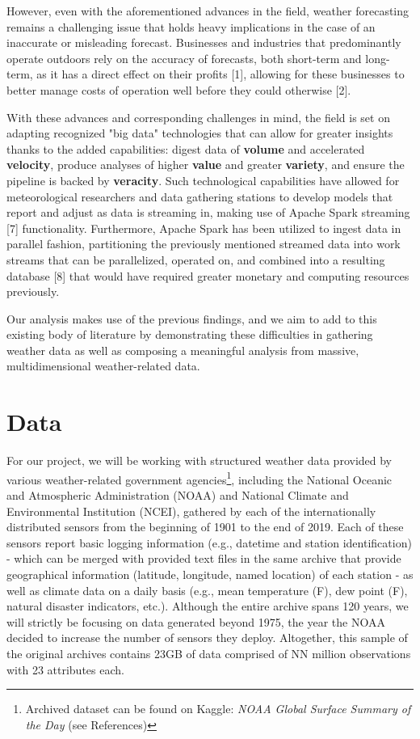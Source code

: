 \documentclass[conference]{IEEEtran}
\begin{document}
However, even with the aforementioned advances in the field, weather forecasting remains a challenging issue that holds heavy implications in the case of an inaccurate or misleading forecast. Businesses and industries that predominantly operate outdoors rely on the accuracy of forecasts, both short-term and long-term, as it has a direct effect on their profits [1], allowing for these businesses to better manage costs of operation well before they could otherwise [2].

With these advances and corresponding challenges in mind, the field is set on adapting recognized "big data" technologies that can allow for greater insights thanks to the added capabilities: digest data of \textbf{volume} and accelerated \textbf{velocity}, produce analyses of higher \textbf{value} and greater \textbf{variety}, and ensure the pipeline is backed by \textbf{veracity}. Such technological capabilities have allowed for meteorological researchers and data gathering stations to develop models that report and adjust as data is streaming in, making use of Apache Spark streaming [7] functionality. Furthermore, Apache Spark has been utilized to ingest data in parallel fashion, partitioning the previously mentioned streamed data into work streams that can be parallelized, operated on, and combined into a resulting database [8] that would have required greater monetary and computing resources previously.

Our analysis makes use of the previous findings, and we aim to add to this existing body of literature by demonstrating these difficulties in gathering weather data as well as composing a meaningful analysis from massive, multidimensional weather-related data.

\section{Data}

For our project, we will be working with structured weather data provided by various weather-related government agencies\footnote{Archived dataset can be found on Kaggle: \textit{NOAA Global Surface Summary of the Day} (see References)}, including the National Oceanic and Atmospheric Administration (NOAA) and National Climate and Environmental Institution (NCEI), gathered by each of the internationally distributed sensors from the beginning of 1901 to the end of 2019. Each of these sensors report basic logging information (e.g., datetime and station identification) - which can be merged with provided text files in the same archive that provide geographical information (latitude, longitude, named location) of each station - as well as climate data on a daily basis (e.g., mean temperature (F), dew point (F), natural disaster indicators, etc.). Although the entire archive spans 120 years, we will strictly be focusing on data generated beyond 1975, the year the NOAA decided to increase the number of sensors they deploy. Altogether, this sample of the original archives contains 23GB of data comprised of NN million observations with 23 attributes each.
\end{document}

